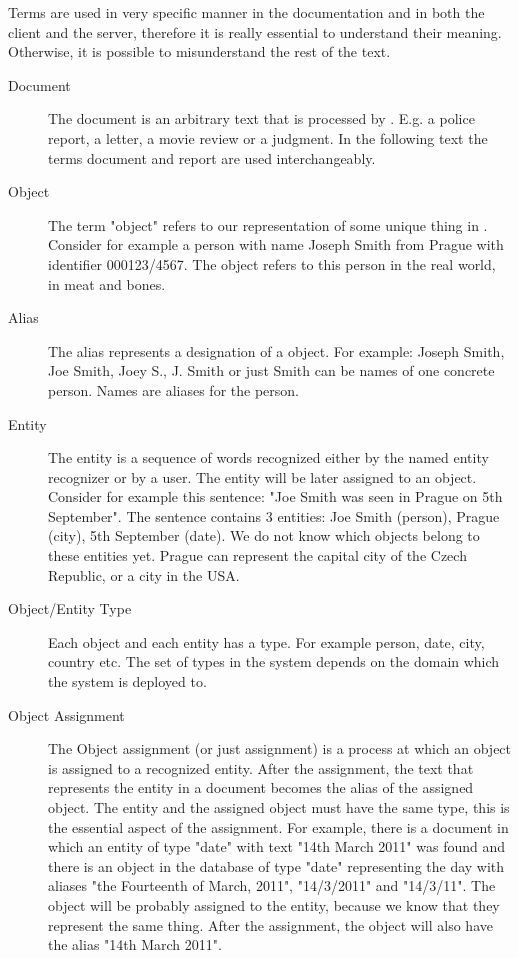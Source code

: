 Terms are used in very specific manner in the documentation and in both the
client and the server, therefore it is really essential to understand their
meaning. Otherwise, it is possible to misunderstand the rest of the text.

\begin{description}
\item[Document]
The document is an arbitrary text that is processed by \textan{}. E.g. a police
report, a letter, a movie review or a judgment. In the following text the terms
document and report are used interchangeably.

\item[Object]
The term "object" refers to our representation of some unique thing in
\textan{}. Consider for example a person with name Joseph Smith from Prague with
identifier 000123/4567. The object refers to this person in the real world, in
meat and bones.

\item[Alias]
The alias represents a designation of a object. For example: Joseph Smith, Joe
Smith, Joey S., J. Smith or just Smith can be names of one concrete person.
Names are aliases for the person.

\item[Entity]
The entity is a sequence of words recognized either by the named entity
recognizer or by a user. The entity will be later assigned to an object.
Consider for example this sentence: "Joe Smith was seen in Prague on 5th
September". The sentence contains 3 entities: Joe Smith (person), Prague (city),
5th September (date). We do not know which objects belong to these entities yet.
Prague can represent the capital city of the Czech Republic, or a city in the
USA.

\item[Object/Entity Type]
Each object and each entity has a type. For example person, date, city, country
etc. The set of types in the system depends on the domain which the system is
deployed to.

\item[Object Assignment]
The Object assignment (or just assignment) is a process at which an object is
assigned to a recognized entity.  After the assignment, the text that represents
the entity in a document becomes the alias of the assigned object. The entity
and the assigned object must have the same type, this is the essential aspect of
the assignment. For example, there is a document in which an entity of type
"date" with text "14th March 2011" was found and there is an object in the
database of type "date" representing the day with aliases "the Fourteenth of
March, 2011", "14/3/2011" and "14/3/11". The object will be probably assigned to
the entity, because we know that they represent the same thing. After the
assignment, the object will also have the alias "14th March 2011".


\end{description}
